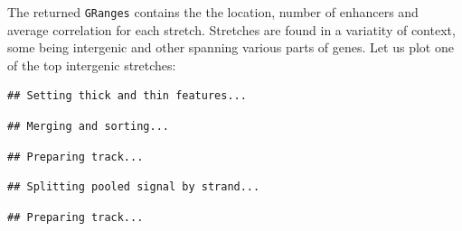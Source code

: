 \documentclass[9pt,a4paper,]{extarticle}
\newenvironment{Shaded}{\begin{snugshade}}{\end{snugshade}}
\newcommand{\KeywordTok}[1]{\textcolor[rgb]{0.13,0.29,0.53}{\textbf{{#1}}}}
\newcommand{\DataTypeTok}[1]{\textcolor[rgb]{0.13,0.29,0.53}{{#1}}}
\newcommand{\DecValTok}[1]{\textcolor[rgb]{0.00,0.00,0.81}{{#1}}}
\newcommand{\StringTok}[1]{\textcolor[rgb]{0.31,0.60,0.02}{{#1}}}
\newcommand{\CommentTok}[1]{\textcolor[rgb]{0.56,0.35,0.01}{\textit{{#1}}}}
\newcommand{\OtherTok}[1]{\textcolor[rgb]{0.56,0.35,0.01}{{#1}}}
\newcommand{\NormalTok}[1]{{#1}}
\begin{document}
The returned \texttt{GRanges} contains the the location, number of enhancers and average correlation for each stretch. Stretches are found in a variatity of context, some being intergenic and other spanning various parts of genes. Let us plot one of the top intergenic stretches:

\begin{Shaded}
\end{Shaded}

\begin{verbatim}
## Setting thick and thin features...
\end{verbatim}

\begin{verbatim}
## Merging and sorting...
\end{verbatim}

\begin{verbatim}
## Preparing track...
\end{verbatim}

\begin{Shaded}
\end{Shaded}

\begin{verbatim}
## Splitting pooled signal by strand...
\end{verbatim}

\begin{verbatim}
## Preparing track...
\end{verbatim}
\end{document}
